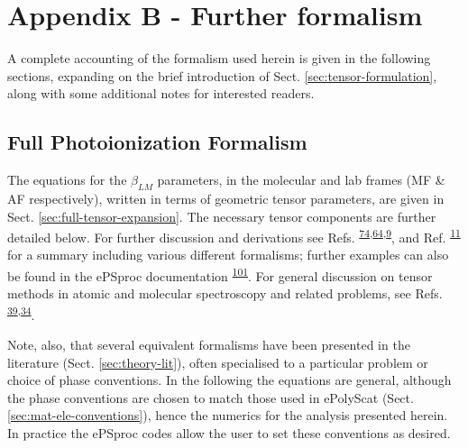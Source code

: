 \documentclass[10pt]{article}
\begin{document}
\section{Appendix B - Further formalism\label{sec:Appendix-B}}

A complete accounting of the formalism used herein is given in the following sections, expanding on the brief introduction of Sect. \ref{sec:tensor-formulation}, along with some additional notes for interested readers.

\subsection{Full Photoionization Formalism \label{appendix:formalism}}


The equations for the \(\beta_{LM}\) parameters, in the molecular and
lab frames (MF \& AF respectively), written in terms of geometric
tensor parameters, are given in Sect. \ref{sec:full-tensor-expansion}. The necessary tensor components are further detailed below. For further discussion and derivations see Refs. \textsuperscript{\hyperref[csl:74]{74},\hyperref[csl:64]{64},\hyperref[csl:9]{9}}, and Ref. \textsuperscript{\hyperref[csl:11]{11}} for a summary including various different formalisms; further examples can also be found in the ePSproc documentation \textsuperscript{\hyperref[csl:101]{101}}. For general discussion on tensor methods in atomic and molecular spectroscopy and related problems, see Refs. \textsuperscript{\hyperref[csl:39]{39},\hyperref[csl:34]{34}}. 

Note, also, that several equivalent formalisms have been presented in the literature (Sect. \ref{sec:theory-lit}), often specialised to a particular problem or choice of phase conventions. In the following the equations are general, although the phase conventions are chosen to match those used in ePolyScat (Sect. \ref{sec:mat-ele-conventions}), hence the numerics for the analysis presented herein. In practice the ePSproc codes allow the user to set these conventions as desired. %

\end{document}
